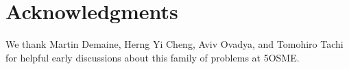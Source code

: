 \documentclass[10pt,twoside]{article}
\begin{document}
\maketitle

%







\section*{Acknowledgments}

We thank Martin Demaine, Herng Yi Cheng, Aviv Ovadya, and Tomohiro Tachi
for helpful early discussions about this family of problems at 5OSME.




\theaffiliations
\end{document}
